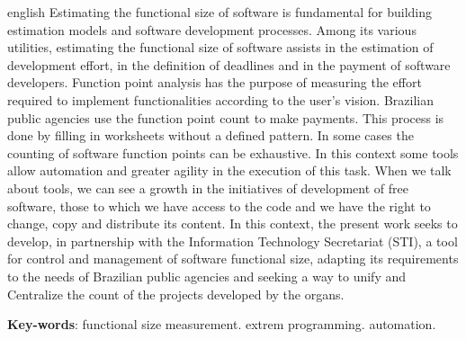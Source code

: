 \begin{resumo}[Abstract]
 \begin{otherlanguage*}{english}
   Estimating the functional size of software is fundamental for building estimation models and software development processes. Among its various utilities, estimating the functional size of software assists in the estimation of development effort, in the definition of deadlines and in the payment of software developers. Function point analysis has the purpose of measuring the effort required to implement functionalities according to the user's vision. Brazilian public agencies use the function point count to make payments. This process is done by filling in worksheets without a defined pattern. In some cases the counting of software function points can be exhaustive. In this context some tools allow automation and greater agility in the execution of this task. When we talk about tools, we can see a growth in the initiatives of development of free software, those to which we have access to the code and we have the right to change, copy and distribute its content. In this context, the present work seeks to develop, in partnership with the Information Technology Secretariat (STI), a tool for control and management of software functional size, adapting its requirements to the needs of Brazilian public agencies and seeking a way to unify and Centralize the count of the projects developed by the organs.

   \vspace{\onelineskip}

   \noindent
   \textbf{Key-words}: functional size measurement. extrem programming. automation.
 \end{otherlanguage*}
\end{resumo}
